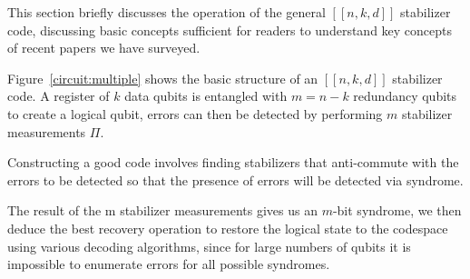 
This section briefly discusses the operation of the general $[[n, k, d]]$ stabilizer code, discussing basic concepts sufficient for readers to understand key concepts of recent papers we have surveyed.

Figure~\ref{circuit:multiple} shows the basic structure of an $[[n,k,d]]$ stabilizer code. A register of $k$ data qubits is entangled with $m = n - k$ redundancy qubits to create a logical qubit, errors can then be detected by performing $m$ stabilizer measurements $\Pi$.

Constructing a good code involves finding stabilizers that anti-commute with the errors to be detected so that the presence of errors will be detected via syndrome.

The result of the m stabilizer measurements gives us an $m$-bit syndrome, we then deduce the best recovery operation to restore the logical state to the codespace using various decoding algorithms, since for large numbers of qubits it is impossible to enumerate errors for all possible syndromes.

